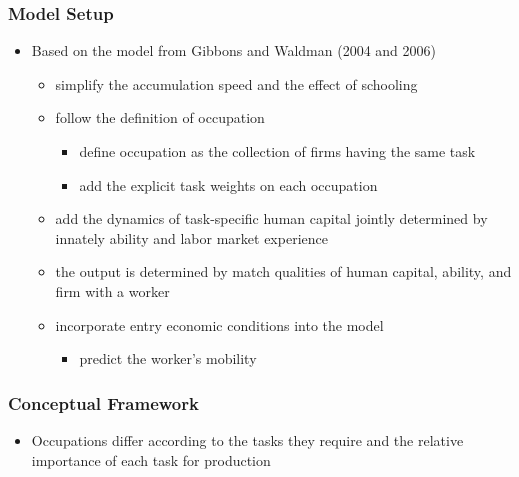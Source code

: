 \documentclass[10pt,svgnames,fragile]{beamer}
\begin{document}
{\begin{frame}
	\frametitle{Model Setup}
	\begin{itemize}
		\item Based on the model from  Gibbons and Waldman {\small (2004 and 2006)}
\vfill
		\begin{itemize}
			\item simplify the accumulation speed and the effect of schooling
\vfill
			\item follow the definition of occupation
			\begin{itemize}
				\vfill
				\item  define occupation as the collection of firms having the same task
				\vfill
				\item add the explicit task weights on each occupation 
			\end{itemize}
\vfill
\item add the dynamics of task-specific human capital jointly determined by innately ability and labor market experience 
\vfill
		\item the output is determined by match qualities of human capital, ability, and firm with a worker
		\vfill
	\item incorporate entry economic conditions into the model
		\begin{itemize}
			\vfill
			\item predict the worker's mobility
		\end{itemize}
		\vfill
		\end{itemize}
\end{itemize}
\end{frame}




\begin{frame}
	\frametitle{Conceptual Framework}
	\begin{itemize}
%
\item 		Occupations differ according to the tasks they require and the relative 	importance of each task for production 
\vfill


\end{itemize}
\end{frame}}
\end{document}
